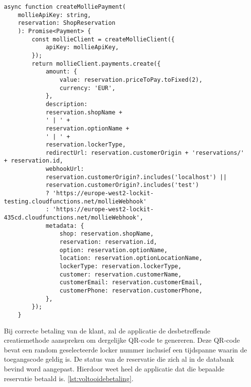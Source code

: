 \begin{lstlisting}[caption={Mollie betaling aanmaken met nodige data.}, label={lst:aanmakenBetalingMollie}]
    async function createMolliePayment(
    mollieApiKey: string,
    reservation: ShopReservation
    ): Promise<Payment> {
        const mollieClient = createMollieClient({
            apiKey: mollieApiKey,
        });
        return mollieClient.payments.create({
            amount: {
                value: reservation.priceToPay.toFixed(2),
                currency: 'EUR',
            },
            description:
            reservation.shopName +
            ' | ' +
            reservation.optionName +
            ' | ' +
            reservation.lockerType,
            redirectUrl: reservation.customerOrigin + 'reservations/' + reservation.id,
            webhookUrl:
            reservation.customerOrigin?.includes('localhost') ||
            reservation.customerOrigin?.includes('test')
            ? 'https://europe-west2-lockit-testing.cloudfunctions.net/mollieWebhook'
            : 'https://europe-west2-lockit-435cd.cloudfunctions.net/mollieWebhook',
            metadata: {
                shop: reservation.shopName,
                reservation: reservation.id,
                option: reservation.optionName,
                location: reservation.optionLocationName,
                lockerType: reservation.lockerType,
                customer: reservation.customerName,
                customerEmail: reservation.customerEmail,
                customerPhone: reservation.customerPhone,
            },
        });
    }
    \end{lstlisting}

Bij correcte betaling van de klant, zal de applicatie de desbetreffende creatiemethode aanspreken om dergelijke QR-code te genereren. Deze QR-code bevat een random geselecteerde locker nummer inclusief een tijdspanne waarin de toegangscode geldig is. De status van de reservatie die zich al in de databank bevind word aangepast. Hierdoor weet heel de applicatie dat die bepaalde reservatie betaald is. \ref{lst:voltooidebetaling}.


